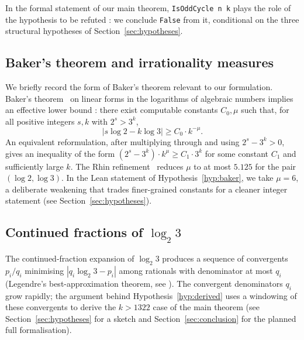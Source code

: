 In the formal statement of our main theorem, \texttt{IsOddCycle n k} plays
the role of the hypothesis to be refuted : we conclude
\texttt{False} from it, conditional on the three structural hypotheses of
Section~\ref{sec:hypotheses}.

\subsection{Baker's theorem and irrationality measures}

We briefly record the form of Baker's theorem relevant to our formulation.
Baker's theorem~\cite{Baker1966} on linear forms in the logarithms of
algebraic numbers implies an effective lower bound :
there exist computable constants \(C_0, \mu\) such that, for all positive
integers \(s, k\) with \(2^s > 3^k\),
\[
|s \log 2 - k \log 3| \geq C_0 \cdot k^{-\mu}.
\]
An equivalent reformulation, after multiplying through and using
\(2^s - 3^k > 0\), gives an inequality of the form
\((2^s - 3^k) \cdot k^{\mu} \geq C_1 \cdot 3^k\) for some constant
\(C_1\) and sufficiently large \(k\). The Rhin refinement~\cite{Rhin1987}
reduces \(\mu\) to at most \(5.125\) for the pair \((\log 2, \log 3)\). In
the Lean statement of Hypothesis~\ref{hyp:baker}, we take \(\mu = 6\), a
deliberate weakening that trades finer-grained constants for a cleaner
integer statement (see Section~\ref{sec:hypotheses}).

\subsection{Continued fractions of \(\log_2 3\)}

The continued-fraction expansion of \(\log_2 3\) produces a sequence of
convergents \(p_i / q_i\) minimising
\(|q_i \log_2 3 - p_i|\) among rationals with denominator at most \(q_i\)
(Legendre's best-approximation theorem, see
\cite{HardyWright1979,Khinchin1964}). The convergent denominators
\(q_i\) grow rapidly; the argument behind
Hypothesis~\ref{hyp:derived} uses a windowing of these convergents to
derive the \(k > 1322\) case of the main theorem (see
Section~\ref{sec:hypotheses} for a sketch and
Section~\ref{sec:conclusion} for the planned full formalisation).

